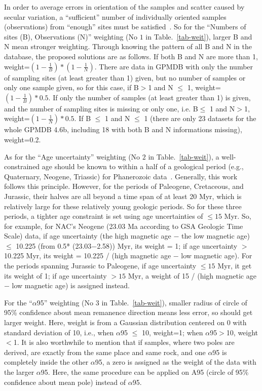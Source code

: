 In order to average errors in orientation of the samples and scatter caused by
secular variation, a ``sufficient'' number of individually oriented samples
(observations) from ``enough'' sites must be satisfied~\cite{T18,v90,B02}. So
for the ``Numbers of sites (B), Observations (N)'' weighting (No $1$ in
Table.~\ref{tab-weit}), larger B and N mean stronger weighting. Through knowing
the pattern of all B and N in the database, the proposed solutions are as
follows. If both B and N are more than 1, weight=$(1- \frac{1}{B})*(1-
\frac{1}{N})$. There are data in GPMDB with only the number of sampling sites
(at least greater than 1) given, but no number of samples or only one sample
given, so for this case, if B$>$1 and N $\leq$ 1, weight=$(1- \frac{1}{B})*0.5$.
If only the number of samples (at least greater than 1) is given, and the
number of sampling sites is missing or only one, i.e. B$\leq$ 1 and N$>$1,
weight=$(1- \frac{1}{N})*0.5$. If B $\leq$ 1 and N $\leq$ 1 (there are only 23
datasets for the whole GPMDB 4.6b, including 18 with both B and N informations
missing), weight=0.2.

As for the ``Age uncertainty'' weighting (No $2$ in Table.~\ref{tab-weit}), a
well-constrained age should be known to within a half of a geological period
(e.g., Quaternary, Neogene, Triassic) for Phanerozoic data~\cite{v90,T18}.
Generally, this work follows this principle. However, for the periods of
Paleogene, Cretaceous, and Jurassic, their halves are all beyond a time span of
at least 20 Myr, which is relatively large for these relatively young geologic
periods. So for these three periods, a tighter age constraint is set using age
uncertainties of $\leq15$ Myr. So, for example, for NAC's Neogene
(23.03 Ma according to GSA Geologic Time Scale) data, if age
uncertainty (the high magnetic age $-$ the low magnetic age) $\leq$ 10.225 (from
0.5* (23.03$-$2.58)) Myr, its weight = 1; if age uncertainty $>$ 10.225 Myr, its
weight = 10.225 / (high magnetic age $-$ low magnetic age). For the periods
spanning Jurassic to Paleogene, if age uncertainty $\leq15$ Myr, it get its
weight of 1; if age uncertainty $>15$ Myr, a weight of 15 / (high magnetic age
$-$ low magnetic age) is assigned instead.

For the ``$\alpha$95'' weighting (No $3$ in Table.~\ref{tab-weit}), smaller
radius of circle of 95\% confidence about mean remanence direction means less
error, so should get larger weight. Here, weight is from a Gaussian distribution
centered on 0 with standard deviation of 10, i.e., when $\alpha$95 $\leq$ 10,
weight=1; when $\alpha$95$>$10, weight$<$1. It is also worthwhile to mention
that if samples, where two poles are derived, are exactly from the same place
and same rock, and one $\alpha$95 is completely inside the other $\alpha$95, a
zero is assigned as the weight of the data with the larger $\alpha$95. Here,
the same procedure can be applied on A95 (circle of 95\% confidence about mean
pole) instead of $\alpha$95.

